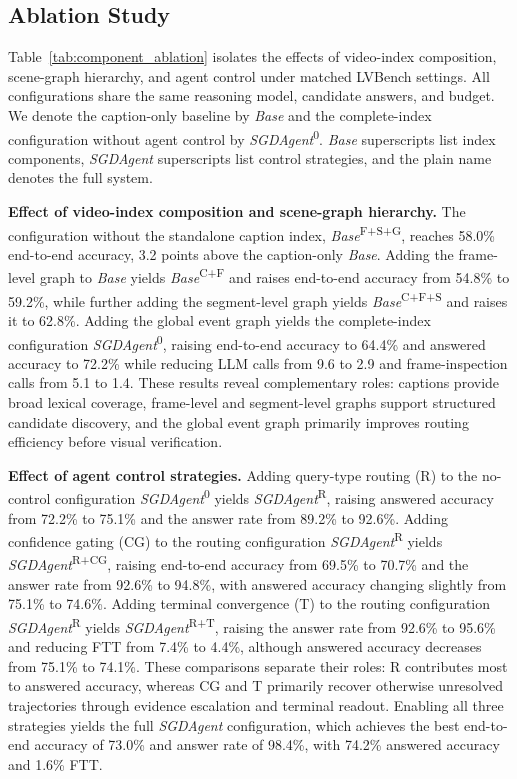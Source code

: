\documentclass[letterpaper]{article} %
\begin{document}
\subsection{Ablation Study}

Table~\ref{tab:component_ablation} isolates the effects of video-index composition, scene-graph hierarchy, and agent control under matched LVBench settings.
All configurations share the same reasoning model, candidate answers, and budget.
We denote the caption-only baseline by \emph{Base} and the complete-index configuration without agent control by \mbox{\emph{SGDAgent}\textsuperscript{0}}.
\emph{Base} superscripts list index components, \emph{SGDAgent} superscripts list control strategies, and the plain name denotes the full system.


\textbf{Effect of video-index composition and scene-graph hierarchy.}
The configuration without the standalone caption index, \mbox{\emph{Base}\textsuperscript{F+S+G}}, reaches 58.0\% end-to-end accuracy, 3.2 points above the caption-only \emph{Base}.
Adding the frame-level graph to \emph{Base} yields \mbox{\emph{Base}\textsuperscript{C+F}} and raises end-to-end accuracy from 54.8\% to 59.2\%, while further adding the segment-level graph yields \mbox{\emph{Base}\textsuperscript{C+F+S}} and raises it to 62.8\%.
Adding the global event graph yields the complete-index configuration \mbox{\emph{SGDAgent}\textsuperscript{0}}, raising end-to-end accuracy to 64.4\% and answered accuracy to 72.2\% while reducing LLM calls from 9.6 to 2.9 and frame-inspection calls from 5.1 to 1.4.
These results reveal complementary roles: captions provide broad lexical coverage, frame-level and segment-level graphs support structured candidate discovery, and the global event graph primarily improves routing efficiency before visual verification.


\textbf{Effect of agent control strategies.}
Adding query-type routing (R) to the no-control configuration \mbox{\emph{SGDAgent}\textsuperscript{0}} yields \mbox{\emph{SGDAgent}\textsuperscript{R}}, raising answered accuracy from 72.2\% to 75.1\% and the answer rate from 89.2\% to 92.6\%.
Adding confidence gating (CG) to the routing configuration \mbox{\emph{SGDAgent}\textsuperscript{R}} yields \mbox{\emph{SGDAgent}\textsuperscript{R+CG}}, raising end-to-end accuracy from 69.5\% to 70.7\% and the answer rate from 92.6\% to 94.8\%, with answered accuracy changing slightly from 75.1\% to 74.6\%.
Adding terminal convergence (T) to the routing configuration \mbox{\emph{SGDAgent}\textsuperscript{R}} yields \mbox{\emph{SGDAgent}\textsuperscript{R+T}}, raising the answer rate from 92.6\% to 95.6\% and reducing FTT from 7.4\% to 4.4\%, although answered accuracy decreases from 75.1\% to 74.1\%.
These comparisons separate their roles: R contributes most to answered accuracy, whereas CG and T primarily recover otherwise unresolved trajectories through evidence escalation and terminal readout.
Enabling all three strategies yields the full \emph{SGDAgent} configuration, which achieves the best end-to-end accuracy of 73.0\% and answer rate of 98.4\%, with 74.2\% answered accuracy and 1.6\% FTT.
\end{document}
